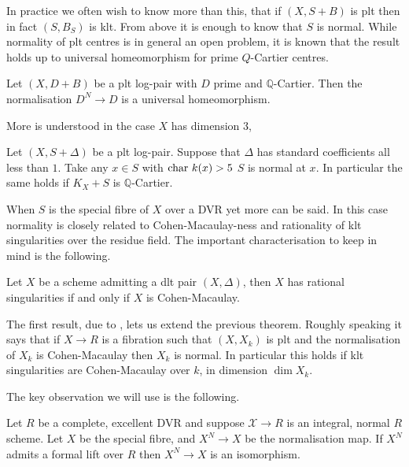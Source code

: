 In practice we often wish to know more than this, that if $(X,S+B)$ is plt then in fact $(S,B_{S})$ is klt. From above it is enough to know that $S$ is normal. While normality of plt centres is in general an open problem, it is known that the result holds up to universal homeomorphism for prime $Q$-Cartier centres.

\begin{lemma}\cite[Lemma 2.1]{hacon2020relative}\label{plt-universal}
	
	Let $(X,D+B)$ be a plt log-pair with $D$ prime and $\mathbb{Q}$-Cartier. Then the normalisation $D^{N} \to D$ is a universal homeomorphism.
	
	\end{lemma}

More is understood in the case $X$ has dimension $3$,

\begin{theorem}\cite[Corollary 7.17]{bhatt2020}\label{plt-adj}
		Let $(X,S+\Delta)$ be a plt log-pair. Suppose that $\Delta$ has standard coefficients all less than $1$. Take any $x \in S$ with $\textup{char } k(x) > 5$ $S$ is normal at $x$. In particular the same holds if $K_{X}+S$ is $\mathbb{Q}$-Cartier.
\end{theorem}

When $S$ is the special fibre of $X$ over a DVR yet more can be said. In this case normality is closely related to Cohen-Macaulay-ness and rationality of klt singularities over the residue field. The important characterisation to keep in mind is the following.

\begin{theorem}\cite[Theorem 1.16]{kovacs2017rational}
	Let $X$ be a scheme admitting a dlt pair $(X,\Delta)$, then $X$ has rational singularities if and only if $X$ is Cohen-Macaulay.
\end{theorem}

The first result, due to \cite{hacon2020relative}, lets us extend the previous theorem. Roughly speaking it says that if $X \to R$ is a fibration such that $(X,X_{k})$ is plt and the normalisation of $X_{k}$ is Cohen-Macaulay then $X_{k}$ is normal. In particular this holds if klt singularities are Cohen-Macaulay over $k$, in dimension $\dim X_{k}$.

The key observation we will use is the following.

\begin{lemma} \label{lift-lemma-1}
	
	Let $R$ be a complete, excellent DVR and suppose $\mathcal{X} \to R$ is an integral, normal $R$ scheme. Let $X$ be the special fibre, and $X^{N} \to X$ be the normalisation map. If $X^{N}$ admits a formal lift over $R$ then $X^{N} \to X$ is an isomorphism.
	
	\end{lemma}

